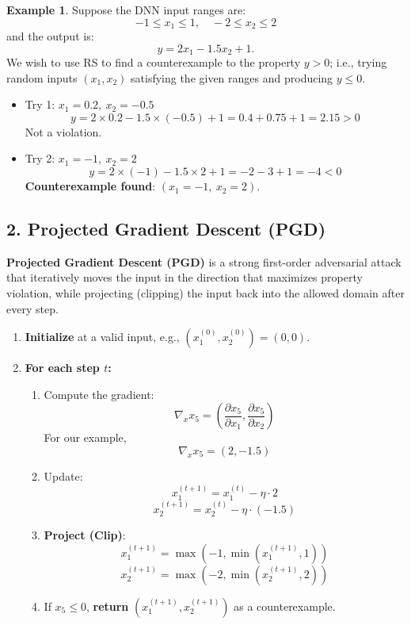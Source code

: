 \documentclass[oneside,11pt,dvipsnames]{book}
\numberwithin{equation}{section}
\theoremstyle{definition}
\newtheorem{example}{Example}[section]
\theoremstyle{remark}
\begin{document}
\begin{example}
Suppose the DNN input ranges are:
\[
-1 \leq x_1 \leq 1,\quad -2 \leq x_2 \leq 2
\]
and the output is:
\[
y = 2x_1 - 1.5x_2 + 1.
\]
We wish to use RS to find a counterexample to the property $y > 0$; i.e.,  trying random inputs $(x_1, x_2)$ satisfying the given ranges and producing $y \leq 0$.


\begin{itemize}
    \item Try 1: $x_1 = 0.2,\ x_2 = -0.5$
    \[
    y = 2 \times 0.2 - 1.5 \times (-0.5) + 1 = 0.4 + 0.75 + 1 = 2.15 > 0
    \]
    Not a violation.

    \item Try 2: $x_1 = -1,\ x_2 = 2$
    \[
    y = 2 \times (-1) - 1.5 \times 2 + 1 = -2 - 3 + 1 = -4 < 0
    \]
    \textbf{Counterexample found}: $(x_1 = -1,\ x_2 = 2)$.
\end{itemize}


\subsection*{2. Projected Gradient Descent (PGD)}

\textbf{Projected Gradient Descent (PGD)} is a strong first-order adversarial attack that iteratively moves the input in the direction that maximizes property violation, while projecting (clipping) the input back into the allowed domain after every step.

\begin{enumerate}
    \item \textbf{Initialize} at a valid input, e.g., $(x_1^{(0)}, x_2^{(0)}) = (0, 0)$.
    \item \textbf{For each step $t$:}
        \begin{enumerate}
            \item Compute the gradient:
            \[
            \nabla_{x} x_5 = \left( \frac{\partial x_5}{\partial x_1}, \frac{\partial x_5}{\partial x_2} \right)
            \]
            For our example,
            \[
            \nabla_{x} x_5 = (2, -1.5)
            \]
            \item Update:
            \[
            x_1^{(t+1)} = x_1^{(t)} - \eta \cdot 2
            \]
            \[
            x_2^{(t+1)} = x_2^{(t)} - \eta \cdot (-1.5)
            \]
            \item \textbf{Project (Clip)}:
            \[
            x_1^{(t+1)} = \max(-1, \min(x_1^{(t+1)}, 1))
            \]
            \[
            x_2^{(t+1)} = \max(-2, \min(x_2^{(t+1)}, 2))
            \]
            \item If $x_5 \leq 0$, \textbf{return} $(x_1^{(t+1)}, x_2^{(t+1)})$ as a counterexample.
        \end{enumerate}
\end{enumerate}


\end{example}
\end{document}
